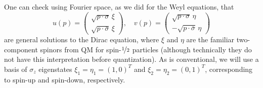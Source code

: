 One can check using Fourier space, as we did for the Weyl equations, that
\begin{equation}
	\label{eq:01_qft_spinors_dirac_solution_up}
	u(p) = \begin{pmatrix} \sqrt{p \cdot \sigma}\, \xi \\ \sqrt{p \cdot \bar\sigma}\, \xi \end{pmatrix}, \quad
	v(p) = \begin{pmatrix} \sqrt{p \cdot \sigma}\, \eta \\ -\sqrt{p \cdot \bar\sigma}\, \eta \end{pmatrix}
\end{equation}
are general solutions to the Dirac equation, where $\xi$ and $\eta$ are the familiar two-component spinors from QM for spin-$\cnicefrac{1}{2}$ particles (although technically they do not have this interpretation before quantization).
As is conventional, we will use a basis of $\sigma_z$ eigenstates $\xi_1 = \eta_1 = (1, 0)^T$ and $\xi_2 = \eta_2 = (0, 1)^T$, corresponding to spin-up and spin-down, respectively.

